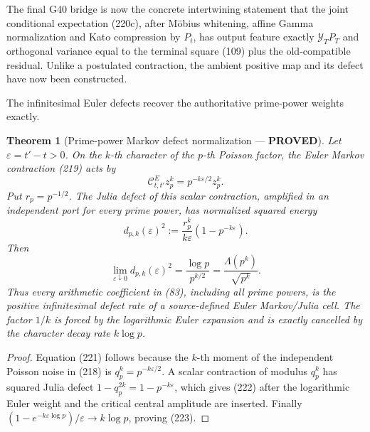 \documentclass[11pt]{article}
\newtheorem{theorem}{Theorem}
\newcommand{\PROVED}{\textcolor{green!45!black}{\textbf{PROVED}}}
\begin{document}
The final G40 bridge is now the concrete intertwining statement that the
joint conditional expectation (220c), after M\"obius whitening, affine
Gamma normalization and Kato compression by $P_t$, has output feature
exactly $\mathcal Y_TP_T$ and orthogonal variance equal to the terminal square
(109) plus the old-compatible residual.  Unlike a postulated contraction,
the ambient positive map and its defect have now been constructed.

The infinitesimal Euler defects recover the authoritative prime-power weights
exactly.

\begin{theorem}[Prime-power Markov defect normalization --- \PROVED]
Let $\varepsilon=t'-t>0$.  On the $k$-th character of the $p$-th Poisson
factor, the Euler Markov contraction (219) acts by
\begin{equation}
 \mathcal C^E_{t,t'}z_p^k
 =p^{-k\varepsilon/2}z_p^k.                           \tag{221}
\end{equation}
Put $r_p=p^{-1/2}$.  The Julia defect of this scalar contraction, amplified
in an independent port for every prime power, has normalized squared energy
\begin{equation}
 d_{p,k}(\varepsilon)^2
 :=\frac{r_p^k}{k\varepsilon}
       \left(1-p^{-k\varepsilon}\right).             \tag{222}
\end{equation}
Then
\begin{equation}
 \lim_{\varepsilon\downarrow0}d_{p,k}(\varepsilon)^2
 =\frac{\log p}{p^{k/2}}
 =\frac{\Lambda(p^k)}{\sqrt{p^k}}.                  \tag{223}
\end{equation}
Thus every arithmetic coefficient in (83), including all prime powers, is
the positive infinitesimal defect rate of a source-defined Euler Markov/Julia
cell.  The factor $1/k$ is forced by the logarithmic Euler expansion and is
exactly cancelled by the character decay rate $k\log p$.
\end{theorem}

\begin{proof}
Equation (221) follows because the $k$-th moment of the independent Poisson
noise in (218) is $q_p^k=p^{-k\varepsilon/2}$.  A scalar contraction of
modulus $q_p^k$ has squared Julia defect $1-q_p^{2k}=1-p^{-k\varepsilon}$,
which gives (222) after the logarithmic Euler weight and the critical central
amplitude are inserted.  Finally
$(1-e^{-k\varepsilon\log p})/\varepsilon\to k\log p$,
proving (223).
\end{proof}
\end{document}
